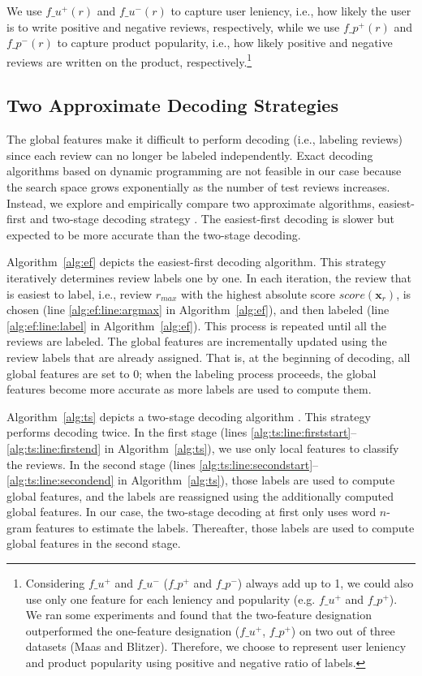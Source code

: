 \documentclass[english]{jnlp_1.4}
\begin{document}
We use $f\_u^+(r)$ and $f\_u^-(r)$ to capture user leniency, i.e., how likely the user is to write positive and negative reviews, respectively, 
while we use $f\_p^+(r)$ and $f\_p^-(r)$ to capture product popularity, i.e., how likely positive and negative reviews are written on the product, respectively.\footnote{
	Considering  $f\_u^+$ and $f\_u^-$ ($f\_p^+$ and $f\_p^-$) always add up to 1, we could also use only one feature for each leniency and popularity (e.g. $f\_u^+$ and $f\_p^+$). We ran some experiments and found that the two-feature designation outperformed the one-feature designation ($f\_u^+$, $f\_p^+$) on two out of three datasets (Maas and Blitzer). Therefore, we choose to represent user leniency and product popularity using positive and negative ratio of labels.}


\subsection{Two Approximate Decoding Strategies}
\label{subsec:decoding}

The global features make it difficult to perform decoding (i.e., labeling reviews) since each review can no longer be labeled independently. 
Exact decoding algorithms based on dynamic programming are not feasible in our case because the search space grows exponentially as the number of test reviews increases.
Instead, we explore and empirically compare two approximate  algorithms, easiest-first \cite{Tsuruoka05} and two-stage decoding strategy \cite{Krishnan06}.
 The easiest-first decoding is slower but expected to be more accurate than the two-stage decoding.

Algorithm~\ref{alg:ef} depicts the easiest-first decoding algorithm. This strategy iteratively determines review labels one by one. 
In each iteration, the review that is easiest to label, i.e., review $r_{max}$ with the highest absolute score $score(\boldsymbol{x}_r)$, is chosen (line \ref{alg:ef:line:argmax} in Algorithm~\ref{alg:ef}), and then labeled (line \ref{alg:ef:line:label} in Algorithm~\ref{alg:ef}). 
This process is repeated until all the reviews are labeled. 
The global features are incrementally updated using the  review labels that are already assigned. 
That is, at the beginning of decoding, all global features are set to 0; when the labeling process proceeds, the global features become more accurate as more labels are used to compute them.


Algorithm~\ref{alg:ts} depicts a two-stage decoding algorithm \cite{Krishnan06}.  
This strategy performs decoding twice.
In the first stage (lines \ref{alg:ts:line:firststart}--\ref{alg:ts:line:firstend} in Algorithm~\ref{alg:ts}), we use only local features to classify the reviews. 
In the second stage (lines \ref{alg:ts:line:secondstart}--\ref{alg:ts:line:secondend} in Algorithm~\ref{alg:ts}), those labels are used to compute global features, and the labels are reassigned using the additionally computed global features. 
In our case, the two-stage decoding at first only uses word $n$-gram features to estimate the labels. 
Thereafter, those labels are used to compute global features in the second stage.
\end{document}

